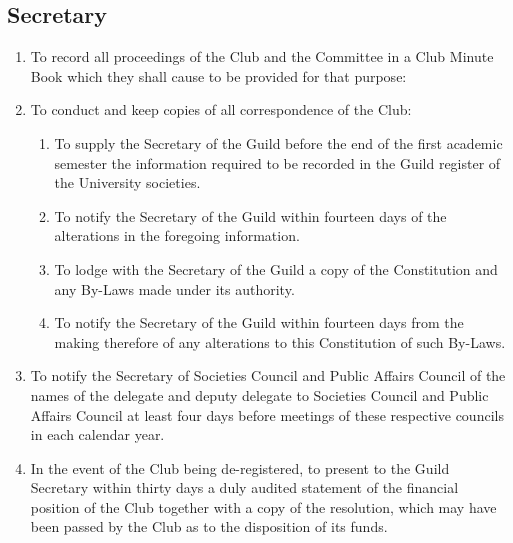 \documentclass[10pt,a4paper]{report}
\begin{document}
		\subsection{Secretary}
			\begin{enumerate}[label=\alph*]
				\item To record all proceedings of the Club and the Committee in a Club Minute Book which they shall cause to be provided for that purpose:
				\item To conduct and keep copies of all correspondence of the Club:
					\begin{enumerate}[label=\roman*]
					\item To supply the Secretary of the Guild before the end of the first academic semester the information required to be recorded in the Guild register of the University societies.
					\item To notify the Secretary of the Guild within fourteen days of the alterations in the foregoing information.
					\item To lodge with the Secretary of the Guild a copy of the Constitution and any By-Laws made under its authority.
					\item To notify the Secretary of the Guild within fourteen days from the making therefore of any alterations to this Constitution of such By-Laws.
					\end{enumerate}
				\item To notify the Secretary of Societies Council and Public Affairs Council of the names of the delegate and deputy delegate to Societies Council and Public Affairs Council at least four days before meetings of these respective councils in each calendar year.
				\item In the event of the Club being de-registered, to present to the Guild Secretary within thirty days a duly audited statement of the financial position of the Club together with a copy of the resolution, which may have been passed by the Club as to the disposition of its funds. 
			\end{enumerate}
\end{document}
